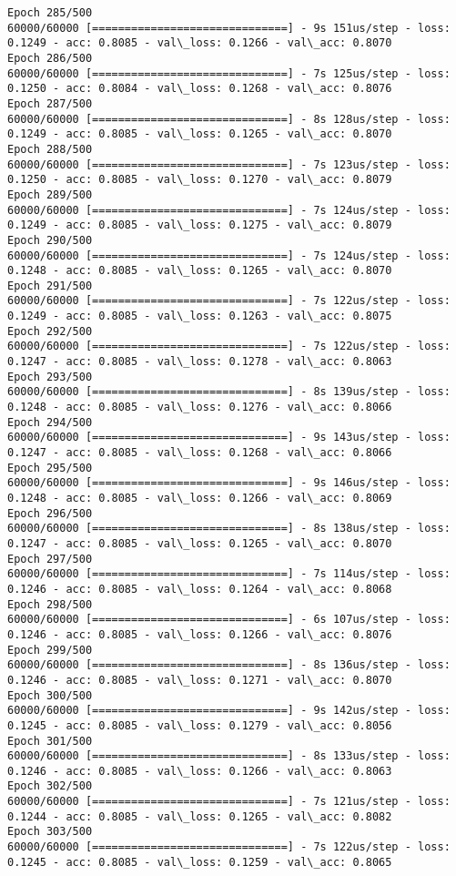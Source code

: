 \documentclass[11pt]{article}
\begin{document}
\begin{Verbatim}[commandchars=\\\{\}]
Epoch 285/500
60000/60000 [==============================] - 9s 151us/step - loss: 0.1249 - acc: 0.8085 - val\_loss: 0.1266 - val\_acc: 0.8070
Epoch 286/500
60000/60000 [==============================] - 7s 125us/step - loss: 0.1250 - acc: 0.8084 - val\_loss: 0.1268 - val\_acc: 0.8076
Epoch 287/500
60000/60000 [==============================] - 8s 128us/step - loss: 0.1249 - acc: 0.8085 - val\_loss: 0.1265 - val\_acc: 0.8070
Epoch 288/500
60000/60000 [==============================] - 7s 123us/step - loss: 0.1250 - acc: 0.8085 - val\_loss: 0.1270 - val\_acc: 0.8079
Epoch 289/500
60000/60000 [==============================] - 7s 124us/step - loss: 0.1249 - acc: 0.8085 - val\_loss: 0.1275 - val\_acc: 0.8079
Epoch 290/500
60000/60000 [==============================] - 7s 124us/step - loss: 0.1248 - acc: 0.8085 - val\_loss: 0.1265 - val\_acc: 0.8070
Epoch 291/500
60000/60000 [==============================] - 7s 122us/step - loss: 0.1249 - acc: 0.8085 - val\_loss: 0.1263 - val\_acc: 0.8075
Epoch 292/500
60000/60000 [==============================] - 7s 122us/step - loss: 0.1247 - acc: 0.8085 - val\_loss: 0.1278 - val\_acc: 0.8063
Epoch 293/500
60000/60000 [==============================] - 8s 139us/step - loss: 0.1248 - acc: 0.8085 - val\_loss: 0.1276 - val\_acc: 0.8066
Epoch 294/500
60000/60000 [==============================] - 9s 143us/step - loss: 0.1247 - acc: 0.8085 - val\_loss: 0.1268 - val\_acc: 0.8066
Epoch 295/500
60000/60000 [==============================] - 9s 146us/step - loss: 0.1248 - acc: 0.8085 - val\_loss: 0.1266 - val\_acc: 0.8069
Epoch 296/500
60000/60000 [==============================] - 8s 138us/step - loss: 0.1247 - acc: 0.8085 - val\_loss: 0.1265 - val\_acc: 0.8070
Epoch 297/500
60000/60000 [==============================] - 7s 114us/step - loss: 0.1246 - acc: 0.8085 - val\_loss: 0.1264 - val\_acc: 0.8068
Epoch 298/500
60000/60000 [==============================] - 6s 107us/step - loss: 0.1246 - acc: 0.8085 - val\_loss: 0.1266 - val\_acc: 0.8076
Epoch 299/500
60000/60000 [==============================] - 8s 136us/step - loss: 0.1246 - acc: 0.8085 - val\_loss: 0.1271 - val\_acc: 0.8070
Epoch 300/500
60000/60000 [==============================] - 9s 142us/step - loss: 0.1245 - acc: 0.8085 - val\_loss: 0.1279 - val\_acc: 0.8056
Epoch 301/500
60000/60000 [==============================] - 8s 133us/step - loss: 0.1246 - acc: 0.8085 - val\_loss: 0.1266 - val\_acc: 0.8063
Epoch 302/500
60000/60000 [==============================] - 7s 121us/step - loss: 0.1244 - acc: 0.8085 - val\_loss: 0.1265 - val\_acc: 0.8082
Epoch 303/500
60000/60000 [==============================] - 7s 122us/step - loss: 0.1245 - acc: 0.8085 - val\_loss: 0.1259 - val\_acc: 0.8065

\end{Verbatim}
\end{document}
